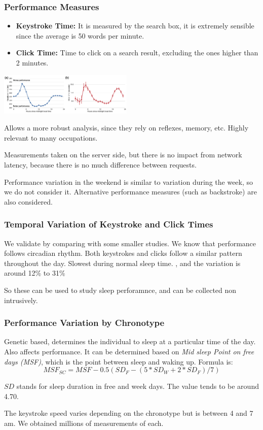\documentclass{IEEEtran}
\begin{document}
      \subsubsection{Performance Measures}
        \begin{itemize}
          \item \textbf{Keystroke Time:} It is measured by the search box, it is extremely sensible since the average is 50 words per minute.
          \item \textbf{Click Time:} Time to click on a search result, excluding the ones higher than 2 minutes. 
        \end{itemize}
        \begin{center}
          \includegraphics[width = 0.48\textwidth]{keystrokeClick.png}
        \end{center}
        \par Allows a more robust analysis, since they rely on reflexes, memory, etc. Highly relevant to many occupations. \par 
        Measurements taken on the server side, but there is no impact from network latency, because there is no much difference between requests.\par 
        Performance variation in the weekend is similar to variation during the week, so we do not consider it. Alternative performance measures (such as backstroke) are also considered.
      \subsubsection{Temporal Variation of Keystroke and Click Times}
        We validate by comparing with some smaller studies. We know that performance follows circadian rhythm. Both keystrokes and clicks follow a similar pattern throughout the day. Slowest during normal sleep time. , and the variation is around 12\% to 31\% \par 
        So these can be used to study sleep perforamnce, and can be collected non intrusively.
      \subsubsection{Performance Variation by Chronotype}
        Genetic based, determines the individual to sleep at a particular time of the day. Also affects performance. It can be determined based on \textit{Mid sleep Point on free days (MSF)}, which is the point between sleep and waking up. Formula is: 
        $$MSF_{SC}=MSF-0.5(SD_{F}-(5*SD_W+2*SD_F)/7)$$
        \par $SD$ stands for sleep duration in free and week days. The value tends to be around 4.70. \par 
        The keystroke speed varies depending on the chronotype but is between 4 and 7 am. We obtained millions of measurements of each.
\end{document}
